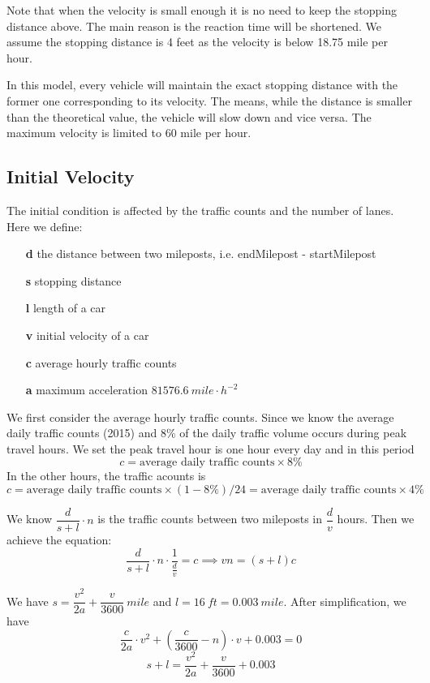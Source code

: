 \documentclass[a4paper,12pt]{article}
\begin{document}
	Note that when the velocity is small enough it is no need to keep the stopping distance above. The main reason is the reaction time will be shortened. We assume the stopping distance is 4 feet as the velocity is below 18.75 mile per hour.

	In this model, every vehicle will maintain the exact stopping distance with the former one corresponding to its velocity. The means, while the distance is smaller than the theoretical value, the vehicle will slow down and vice versa. The maximum velocity is limited to 60 mile per hour.

	\subsection{Initial Velocity}
	The initial condition is affected by the traffic counts and the number of lanes. Here we define:
	\begin{enumerate}
		\item [\textbf{d}] the distance between two mileposts, i.e. endMilepost - startMilepost
		\item [\textbf{s}] stopping distance
		\item [\textbf{l}] length of a car
		\item [\textbf{v}] initial velocity of a car
		\item [\textbf{c}] average hourly traffic counts
		\item [\textbf{a}] maximum acceleration $ 81576.6\ mile\cdot h^{-2} $
	\end{enumerate}
	We first consider the average hourly traffic counts. Since we know the average daily traffic counts (2015) and 8\% of the daily traffic volume occurs during peak travel hours. We set the peak travel hour is one hour every day and in this period $$ c=\text{average daily traffic counts}\times 8\% $$ In the other hours, the traffic acounts is  $$ c=\text{average daily traffic counts}\times (1-8\%)/24=\text{average daily traffic counts}\times 4\%  $$

	We know $ \dfrac{d}{s+l}\cdot n $ is the traffic counts between two mileposts in $ \dfrac{d}{v} $ hours. Then we achieve the equation:
	$$ \dfrac{d}{s+l}\cdot n\cdot\frac{1}{\frac{d}{v}}=c\implies vn=(s+l)c $$

	We have $ s=\dfrac{v^2}{2a}+\dfrac{v}{3600}\ mile $ and $ l=16\ ft=0.003\ mile $. After simplification, we have
	$$ \dfrac{c}{2a}\cdot v^2+\left(\dfrac{c}{3600}-n\right)\cdot v+0.003=0 $$
	$$ s+l=\dfrac{v^2}{2a}+\dfrac{v}{3600}+0.003 $$
\end{document}
